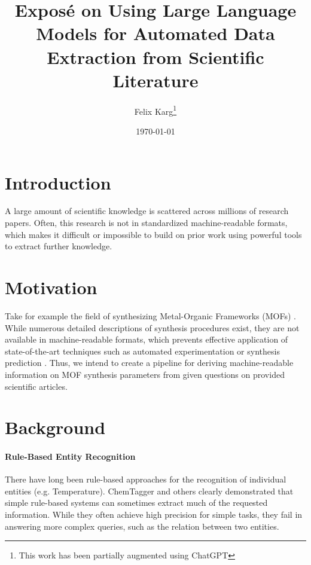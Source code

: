 \documentclass[a4paper,11pt]{article}
\title{Exposé on Using Large Language Models for Automated Data Extraction from Scientific Literature}
\author{Felix Karg\footnote{This work has been partially augmented using ChatGPT}}
\date{\today}
\newcommand{\margtodo}                                 %
{\marginpar{\textbf{\textcolor{red}{ToDo}}}{}}
\newcommand{\todo}[1]
{{\textbf{\textcolor{red}{[\margtodo{}#1]}}}{}}   %
\begin{document}
\maketitle




\section{Introduction}
A large amount of scientific knowledge is scattered across millions of research
papers. Often, this research is not in standardized machine-readable formats,
which makes it difficult or impossible to build on prior work using powerful
tools to extract further knowledge.  %

\section{Motivation}
Take for example the field of synthesizing Metal-Organic Frameworks (MOFs)
\cite{zhou_introduction_2012}. While numerous detailed descriptions of
synthesis procedures exist, they are not available in machine-readable formats,
which prevents effective application of state-of-the-art techniques such as
automated experimentation \cite{shi_automated_2021} or synthesis prediction
\cite{luo_mof_2022}. Thus, we intend to create a pipeline for deriving
machine-readable information on MOF synthesis parameters from given questions
on provided scientific articles.


\section{Background}
\paragraph{Rule-Based Entity Recognition}
There have long been rule-based approaches for the recognition of individual
entities (e.g. Temperature). ChemTagger \cite{hawizy_chemicaltagger_2011}
and others \cite{beard_comparative_2019, huang_database_2020}
clearly demonstrated that simple rule-based systems can sometimes extract much
of the requested information. While they often achieve high precision for
simple tasks, they fail in answering more complex queries, such as the relation
between two entities.
\end{document}

